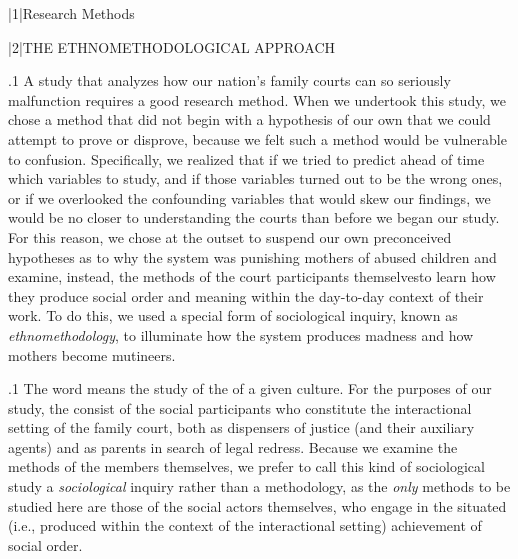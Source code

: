 \documentclass[11pt, twoside]{article}
\begin{document}
\thispagestyle{empty}

{\fontsize{13}{19}\selectfont


\hspace{-5em}\begin{minipage}{1.1\textwidth}
\begin{flushright}
{\fontsize{14}{22}\selectfont
\textbf{%
}
}
\end{flushright}
\end{minipage}


\vspace{6em}





\s|1|{Research Methods}


\s|2|{THE ETHNOMETHODOLOGICAL APPROACH}

\p.1{%
\noindent{}A study that analyzes how our nation’s family courts can so seriously
malfunction requires a good research method. When we undertook this
study, we chose a method that did not begin with a hypothesis of our
own that we could attempt to prove or disprove, because we felt such
a method would be vulnerable to confusion. Specifically, we realized
that if we tried to predict ahead of time which variables to study, and
if those variables turned out to be the wrong ones, or if we overlooked
the confounding variables that would skew our findings, we would be
no closer to understanding the courts than before we began our study.
For this reason, we chose at the outset to suspend
our own preconceived hypotheses as to why the system was punishing mothers of abused
children and examine, instead, the methods of the court participants
themselves\mdash{}to learn how they produce social order and meaning within
the day-to-day context of their work. To do this, we used a special form
of sociological inquiry, known as \textit{ethnomethodology}, to illuminate how
the system produces madness and how mothers become mutineers.
}%

\p.1{%
The word  means the study of \mdash{}the  of a given culture. For the purposes of our
study, the  consist of the social participants who constitute
the interactional setting of the family court, both as dispensers of justice (and their auxiliary agents) and as parents in search of legal redress.
Because we examine the methods of the members themselves, we prefer
to call this kind of sociological study a \textit{sociological} inquiry rather than a
methodology, as the \textit{only} methods to be studied here are those of the social actors themselves, who engage in the situated (i.e., produced within
the context of the interactional setting) achievement of social order.
}%

}
\end{document}
